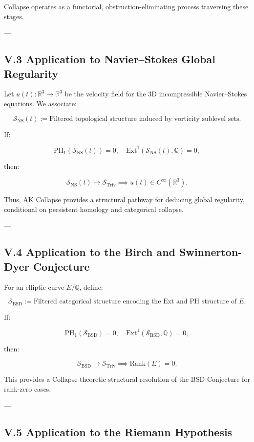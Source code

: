 \documentclass[11pt]{article}
\begin{document}
Collapse operates as a functorial, obstruction-eliminating process traversing these stages.

---

\subsection*{V.3 Application to Navier–Stokes Global Regularity}

Let $u(t) : \mathbb{R}^3 \to \mathbb{R}^3$ be the velocity field for the 3D incompressible Navier–Stokes equations.  
We associate:

\[
\mathcal{S}_{\mathrm{NS}}(t) := \text{Filtered topological structure induced by vorticity sublevel sets.}
\]

If:

\[
\mathrm{PH}_1(\mathcal{S}_{\mathrm{NS}}(t)) = 0, \quad \mathrm{Ext}^1(\mathcal{S}_{\mathrm{NS}}(t), \mathbb{Q}) = 0,
\]

then:

\[
\mathcal{S}_{\mathrm{NS}}(t) \longrightarrow \mathcal{S}_{\mathrm{Triv}} \implies u(t) \in C^\infty(\mathbb{R}^3).
\]

Thus, AK Collapse provides a structural pathway for deducing global regularity, conditional on persistent homology and categorical collapse.

---

\subsection*{V.4 Application to the Birch and Swinnerton-Dyer Conjecture}

For an elliptic curve $E/\mathbb{Q}$, define:

\[
\mathcal{S}_{\mathrm{BSD}} := \text{Filtered categorical structure encoding the Ext and PH structure of } E.
\]

If:

\[
\mathrm{PH}_1(\mathcal{S}_{\mathrm{BSD}}) = 0, \quad \mathrm{Ext}^1(\mathcal{S}_{\mathrm{BSD}}, \mathbb{Q}) = 0,
\]

then:

\[
\mathcal{S}_{\mathrm{BSD}} \longrightarrow \mathcal{S}_{\mathrm{Triv}} \implies \mathrm{Rank}(E) = 0.
\]

This provides a Collapse-theoretic structural resolution of the BSD Conjecture for rank-zero cases.

---

\subsection*{V.5 Application to the Riemann Hypothesis}
\end{document}
